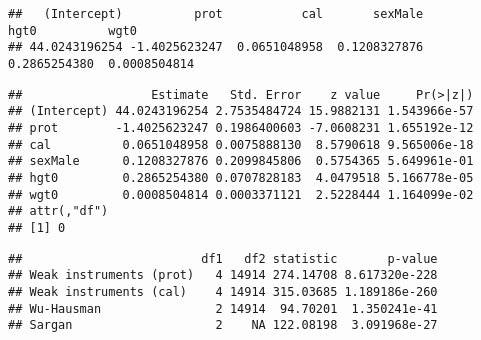 \documentclass[
]{book}
\newenvironment{Shaded}{\begin{snugshade}}{\end{snugshade}}
\newcommand{\CommentTok}[1]{\textcolor[rgb]{0.56,0.35,0.01}{\textit{#1}}}
\newcommand{\DataTypeTok}[1]{\textcolor[rgb]{0.13,0.29,0.53}{#1}}
\newcommand{\KeywordTok}[1]{\textcolor[rgb]{0.13,0.29,0.53}{\textbf{#1}}}
\newcommand{\NormalTok}[1]{#1}
\newcommand{\OperatorTok}[1]{\textcolor[rgb]{0.81,0.36,0.00}{\textbf{#1}}}
\newcommand{\OtherTok}[1]{\textcolor[rgb]{0.56,0.35,0.01}{#1}}
\newcommand{\StringTok}[1]{\textcolor[rgb]{0.31,0.60,0.02}{#1}}
\begin{document}
\begin{verbatim}
##   (Intercept)          prot           cal       sexMale          hgt0          wgt0 
## 44.0243196254 -1.4025623247  0.0651048958  0.1208327876  0.2865254380  0.0008504814
\end{verbatim}

\begin{Shaded}
\end{Shaded}

\begin{verbatim}
##                  Estimate   Std. Error    z value     Pr(>|z|)
## (Intercept) 44.0243196254 2.7535484724 15.9882131 1.543966e-57
## prot        -1.4025623247 0.1986400603 -7.0608231 1.655192e-12
## cal          0.0651048958 0.0075888130  8.5790618 9.565006e-18
## sexMale      0.1208327876 0.2099845806  0.5754365 5.649961e-01
## hgt0         0.2865254380 0.0707828183  4.0479518 5.166778e-05
## wgt0         0.0008504814 0.0003371121  2.5228444 1.164099e-02
## attr(,"df")
## [1] 0
\end{verbatim}

\begin{Shaded}
\end{Shaded}

\begin{verbatim}
##                         df1   df2 statistic       p-value
## Weak instruments (prot)   4 14914 274.14708 8.617320e-228
## Weak instruments (cal)    4 14914 315.03685 1.189186e-260
## Wu-Hausman                2 14914  94.70201  1.350241e-41
## Sargan                    2    NA 122.08198  3.091968e-27
\end{verbatim}
\end{document}

